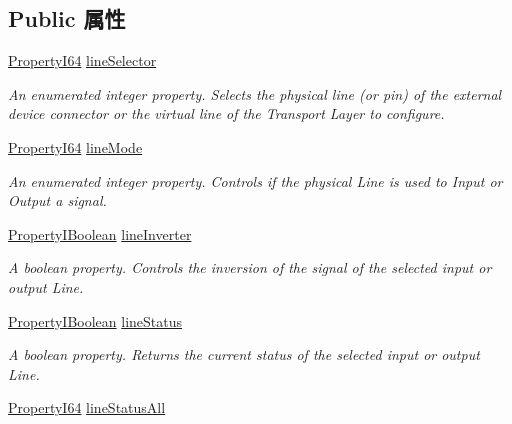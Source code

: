 \subsection*{Public 属性}
\begin{DoxyCompactItemize}
\item 
\hyperlink{group___common_interface_ga81749b2696755513663492664a18a893}{Property\+I64} \hyperlink{classmv_i_m_p_a_c_t_1_1acquire_1_1_gen_i_cam_1_1_digital_i_o_control_afbd78071c4f6edc4bf4dca924c969e97}{line\+Selector}
\begin{DoxyCompactList}\small\item\em An enumerated integer property. Selects the physical line (or pin) of the external device connector or the virtual line of the Transport Layer to configure. \end{DoxyCompactList}\item 
\hyperlink{group___common_interface_ga81749b2696755513663492664a18a893}{Property\+I64} \hyperlink{classmv_i_m_p_a_c_t_1_1acquire_1_1_gen_i_cam_1_1_digital_i_o_control_a29a79ff170f40fe0edf89f93c0d97d2f}{line\+Mode}
\begin{DoxyCompactList}\small\item\em An enumerated integer property. Controls if the physical Line is used to Input or Output a signal. \end{DoxyCompactList}\item 
\hyperlink{group___common_interface_ga44f9437e24b21b6c93da9039ec6786aa}{Property\+I\+Boolean} \hyperlink{classmv_i_m_p_a_c_t_1_1acquire_1_1_gen_i_cam_1_1_digital_i_o_control_a05c64d63aafc81c859db263133c91ba2}{line\+Inverter}
\begin{DoxyCompactList}\small\item\em A boolean property. Controls the inversion of the signal of the selected input or output Line. \end{DoxyCompactList}\item 
\hyperlink{group___common_interface_ga44f9437e24b21b6c93da9039ec6786aa}{Property\+I\+Boolean} \hyperlink{classmv_i_m_p_a_c_t_1_1acquire_1_1_gen_i_cam_1_1_digital_i_o_control_a5db5fc8881e558c398580000f34874cb}{line\+Status}
\begin{DoxyCompactList}\small\item\em A boolean property. Returns the current status of the selected input or output Line. \end{DoxyCompactList}\item 
\hyperlink{group___common_interface_ga81749b2696755513663492664a18a893}{Property\+I64} \hyperlink{classmv_i_m_p_a_c_t_1_1acquire_1_1_gen_i_cam_1_1_digital_i_o_control_a09d27fa917e5f45b123e14c5d5d19f98}{line\+Status\+All}

\end{DoxyCompactItemize}
